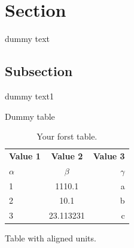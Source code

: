 \documentclass{article}
\begin{document}
    \tableofcontents
    \newpage
    \section{Section}
    dummy text
    \subsection{Subsection}
    dummy text1
    \begin{table}
        \caption{Dummy table}
    \end{table}
    \begin{appendix}
        \listoffigures
        \listoftables
    \end{appendix}
    \newpage
    
    
    \begin{table}[h!]
        \begin{center}
            \caption{Your forst table.}
            \label{tab:table1}
            \begin{tabular}{|l|c|r|}
                \textbf{Value 1} & \textbf{Value 2} & \textbf{Value 3}\\
                $\alpha$ & $\beta$ & $\gamma$\\
                \hline
                1 & 1110.1 & a\\
                2 & 10.1 & b\\
                3 & 23.113231 & c\\
            \end{tabular}
        \end{center}
    \end{table}

    \begin{table}[h!]
        \begin{center}
            \caption{Table with aligned units.}
            \label{tab:tabel1}
            \
        \end{center}
        
    \end{table}
\end{document}
